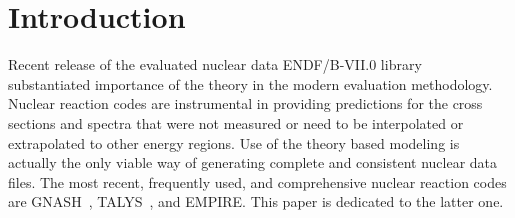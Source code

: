 \maketitle
\tableofcontents





\vspace*{12mm} 
  \lfoot{} \rfoot{} %
\setlength{\headrulewidth}{0.4pt} \setlength{\footrulewidth}{0.4pt}

%

\newpage

\section{Introduction}

Recent release of the evaluated nuclear data ENDF/B-VII.0 library~\cite%
{ENDF-VII} substantiated importance of the theory in the modern evaluation
methodology. Nuclear reaction codes are instrumental in providing
predictions for the cross sections and spectra that were not measured or
need to be interpolated or extrapolated to other energy regions. Use of the
theory based modeling is actually the only viable way of generating
complete and consistent nuclear data files. The most recent, frequently
used, and comprehensive nuclear reaction codes are GNASH~\cite{Young:77,
Young:92, Young:98}, TALYS~\cite{TALYS}, and EMPIRE. This paper is dedicated
to the latter one.

